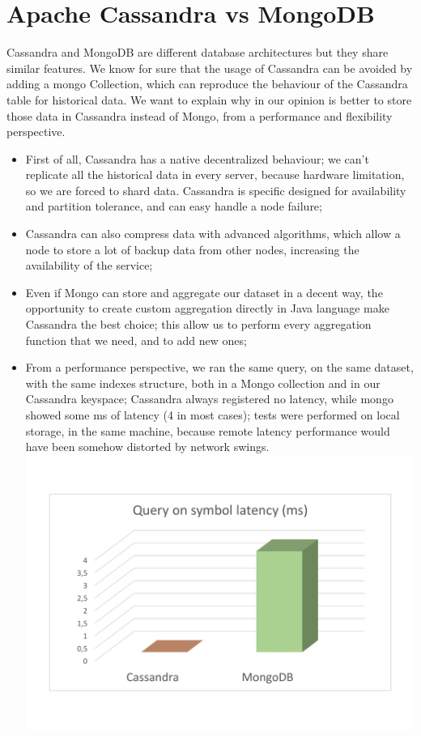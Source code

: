 \section{Apache Cassandra vs MongoDB}
Cassandra and MongoDB are different database architectures but they share similar features. 
We know for sure that the usage of Cassandra can be avoided by adding a mongo Collection,
which can reproduce the behaviour of the Cassandra table for historical data. We want to explain
why in our opinion is better to store those data in Cassandra instead of Mongo, from a
performance and flexibility perspective.
\begin{itemize}
    \item 
    First of all, Cassandra has a native decentralized behaviour; we can't replicate all
    the historical data in every server, because hardware limitation, so we are forced to 
    shard data. Cassandra is specific designed for availability and partition tolerance,
    and can easy handle a node failure;
    \item 
    Cassandra can also compress data with advanced algorithms, which allow a node to store a lot
    of backup data from other nodes, increasing the availability of the service;
    \item
    Even if Mongo can store and aggregate our dataset in a decent way, the opportunity to
    create custom aggregation directly in Java language make Cassandra the best choice; this 
    allow us to perform every aggregation function that we need, and to add new ones;
    \item
    From a performance perspective, we ran the same query, on the same dataset, with the same 
    indexes structure, both in a Mongo collection and in our Cassandra keyspace; Cassandra
    always registered no latency, while mongo showed some ms of latency (4 in most cases);
    tests were performed on local storage, in the same machine,
    because remote latency performance would have been 
    somehow distorted by network swings.\\
    \includegraphics[scale=0.16]{img/cassandra_vs_mongoDB.png}\\

\end{itemize}
